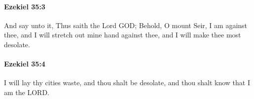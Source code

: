		\paragraph{Ezekiel 35:3} %
			\label{EZEKIEL-35-3}

			And say unto it, Thus saith the Lord GOD; Behold, O mount Seir, I am against thee, and I will stretch out mine hand against thee, and I will make thee most desolate.


		\paragraph{Ezekiel 35:4} %
			\label{EZEKIEL-35-4}

			I will lay thy cities waste, and thou shalt be desolate, and thou shalt know that I am the LORD.



